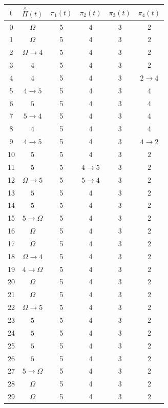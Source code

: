 \documentclass[10pt,a4paper]{article}
\begin{document}
\begin{center}
 \begin{tabular}{||c c c c c c||} 
 \hline
 t & $\overset{\mathrm{\wedge}}{\Pi}(t)$ & $\pi_1(t)$
 & $\pi_2(t)$ & $\pi_3(t)$ & $\pi_4(t)$  \\ [0.5ex] 
 \hline\hline
 0 & $\Omega$ & 5 & 4 & 3 & 2 \\ 
 \hline
 1 & $\Omega$ & 5 & 4 & 3 & 2 \\
 \hline
 2 & $\Omega\rightarrow4$& 5 & 4 & 3 & 2  \\
 \hline
 3 & $4$ & 5 & 4 & 3 & 2  \\
 \hline
 4 & $4$ & 5 & 4 & 3 & $2\rightarrow4$  \\
 \hline
 5 & $4\rightarrow5$ & 5 & 4 & 3 & 4  \\
 \hline
 6 & $5$ & 5 & 4 & 3 & 4  \\
 \hline
 7 & $5\rightarrow4$ & 5 & 4 & 3 & 4  \\
 \hline
 8 & $4$ & 5 & 4 & 3 & 4  \\
 \hline
 9 & $4\rightarrow5$ & 5 & 4 & 3 & $4\rightarrow2$ \\
 \hline
 10 & $5$ & 5 & 4 & 3 & $2$ \\
 \hline
 11 & $5$ & 5 & $4\rightarrow5$ & 3 & $2$ \\
 \hline
 12 & $\Omega\rightarrow5$ & 5 & $5\rightarrow4$ & 3 & 2 \\
 \hline
 13 & $5$ & 5 & 4 & 3 & 2 \\
 \hline
 14 & $5$ & 5 & 4 & 3 & 2 \\
 \hline
 15 & $5\rightarrow\Omega$ & 5 & 4 & 3 & 2 \\
 \hline
 16 & $\Omega$ & 5 & 4 & 3 & 2 \\
 \hline
 17 & $\Omega$ & 5 & 4 & 3 & 2 \\
 \hline
 18 & $\Omega\rightarrow4$ & 5 & 4 & 3 & 2 \\
 \hline
 19 & $4\rightarrow\Omega$ & 5 & 4 & 3 & 2 \\
 \hline
 20 & $\Omega$ & 5 & 4 & 3 & 2 \\
 \hline
 21 & $\Omega$ & 5 & 4 & 3 & 2 \\
 \hline
 22 & $\Omega\rightarrow5$ & 5 & 4 & 3 & 2 \\
 \hline
 23 & $5$ & 5 & 4 & 3 & 2 \\
 \hline
 24 & $5$ & 5 & 4 & 3 & 2 \\
 \hline
 25 & $5$ & 5 & 4 & 3 & 2 \\
 \hline
 26 & $5$ & 5 & 4 & 3 & 2 \\
 \hline
 27 & $5\rightarrow\Omega$ & 5 & 4 & 3 & 2 \\
 \hline
 28 & $\Omega$ & 5 & 4 & 3 & 2 \\
 \hline
 29 & $\Omega$ & 5 & 4 & 3 & 2 \\
 [1ex] 
 \hline
\end{tabular}
\end{center}
\end{document}
